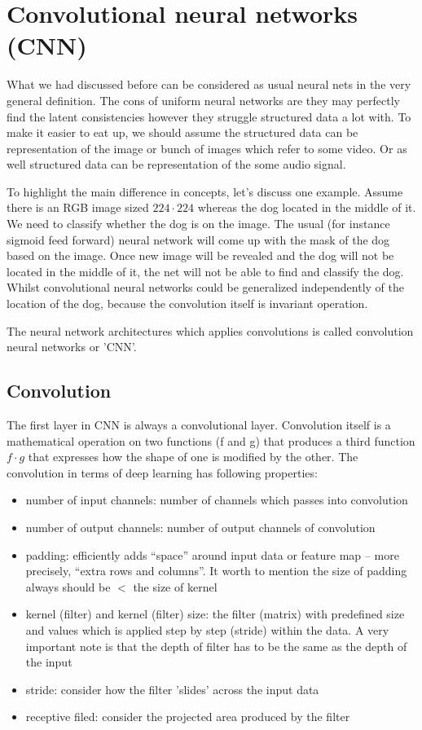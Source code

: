 \section{Convolutional neural networks (CNN)}
What we had discussed before can be considered as usual neural nets in the very general definition. The cons of uniform neural networks are they may perfectly find the latent consistencies however they struggle structured data a lot with. To make it easier to eat up, we should assume the structured data can be representation of the image or bunch of images which refer to some video. Or as well structured data can be representation of the some audio signal.

To highlight the main difference in concepts, let's discuss one example.
Assume there is an RGB image sized $224 \cdot 224$ whereas the dog located in the middle of it. We need to classify whether the dog is on the image. The usual (for instance sigmoid feed forward) neural network will come up with the mask of the dog based on the image. Once new image will be revealed and the dog will not be located in the middle of it, the net will not be able to find and classify the dog. Whilst convolutional neural networks could be generalized independently of the location of the dog, because the convolution itself is invariant operation.         

The neural network architectures which applies convolutions is called convolution neural networks or 'CNN'.    

\subsection{Convolution}
The first layer in CNN is always a convolutional layer. Convolution itself is a mathematical operation on two functions (f and g) that produces a third function $f \cdot g$ that expresses how the shape of one is modified by the other. The convolution in terms of deep learning has following properties:  
\begin{itemize}
    \item number of input channels: number of channels which passes into convolution 
    \item number of output channels: number of output channels of convolution
    \item padding: efficiently adds “space” around input data or feature map – more precisely, “extra rows and columns”. It worth to mention the size of padding always should be $<$ the size of kernel 
    \item kernel (filter) and kernel (filter) size: the filter (matrix) with predefined size and values which is applied step by step (stride) within the data. A very important note is that the depth of filter has to be the same as the depth of the input
    \item stride: consider how the filter 'slides' across the input data
    \item receptive filed: consider the projected area produced by the filter
\end{itemize}

